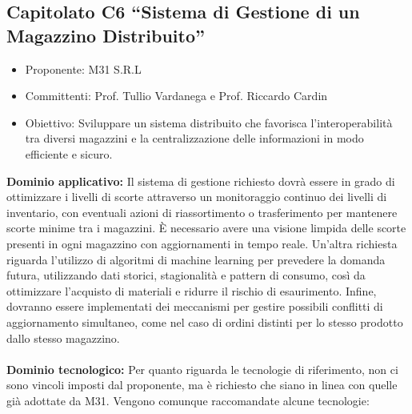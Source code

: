 \documentclass[10pt]{article}
\begin{document}
\subsection{Capitolato C6 “Sistema di Gestione di un Magazzino Distribuito”}
\begin{itemize}
    \item Proponente: M31 S.R.L
    \item Committenti: Prof. Tullio Vardanega e Prof. Riccardo Cardin
    \item Obiettivo: Sviluppare un sistema distribuito che favorisca l’interoperabilità tra diversi magazzini e la centralizzazione delle informazioni in modo efficiente e sicuro.
\end{itemize}
\textbf{Dominio applicativo:}
Il sistema di gestione richiesto dovrà essere in grado di ottimizzare i livelli di scorte attraverso un monitoraggio continuo dei livelli di inventario, con eventuali azioni di riassortimento o trasferimento per mantenere scorte minime tra i magazzini. È necessario avere una visione limpida delle scorte presenti in ogni magazzino con aggiornamenti in tempo reale. Un’altra richiesta riguarda l’utilizzo di algoritmi di machine learning per prevedere la domanda futura, utilizzando dati storici, stagionalità e pattern di consumo, così da ottimizzare l’acquisto di materiali e ridurre il rischio di esaurimento. Infine, dovranno essere implementati dei meccanismi per gestire possibili conflitti di aggiornamento simultaneo, come nel caso di ordini distinti per lo stesso prodotto dallo stesso magazzino.\\
\\
\textbf{Dominio tecnologico:}
Per quanto riguarda le tecnologie di riferimento, non ci sono vincoli imposti dal proponente, ma è richiesto che siano in linea con quelle già adottate da M31. Vengono comunque raccomandate alcune tecnologie:
\end{document}
